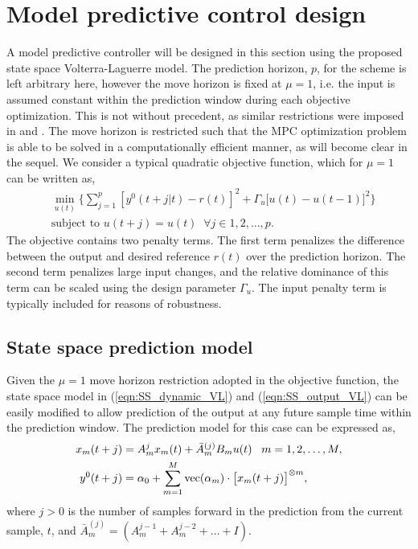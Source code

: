 \section{Model predictive control design}

A model predictive controller will be designed in this section using the proposed state space Volterra-Laguerre model. The prediction horizon, $p$, for the scheme is left arbitrary here, however the move horizon is fixed at $\mu = 1$, i.e. the input is assumed constant within the prediction window during each objective optimization. This is not without precedent, as similar restrictions were imposed in \cite{Parker1998} and \cite{Antoine2006}. The move horizon is restricted such that the MPC optimization problem is able to be solved in a computationally efficient manner, as will become clear in the sequel. We consider a typical quadratic objective function, which for $\mu =1$ can be written as,
\begin{align}
\label{eqn:MPC_ObjFn_Chap10}
&\min_{u(t)} \Bigg\{ \sum_{j=1}^{p} [y^0(t+j|t) - r(t)]^2  + \Gamma_u \big[ u(t) - u(t-1) \big]^2 \Bigg\} \\
&\textrm{subject to } u(t+j) = u(t) \; \; \forall j \in 1,2,\hdots,p. \nonumber
\end{align}
The objective contains two penalty terms. The first term penalizes the difference between the output and desired reference $r(t)$ over the prediction horizon. The second term penalizes large input changes, and the relative dominance of this term can be scaled using the design parameter $\Gamma_u$. The input penalty term is typically included for reasons of robustness.

\subsection{State space prediction model}

Given the $\mu = 1$ move horizon restriction adopted in the objective function, the state space model in (\ref{eqn:SS_dynamic_VL}) and (\ref{eqn:SS_output_VL}) can be easily modified to allow prediction of the output at any future sample time within the prediction window. The prediction model for this case can be expressed as,
\begin{align}
x_m(t+j) &= A_m^j x_m(t) + \bar{A}_m^{(j)} B_m u(t) \; \; \; m = 1,2,\hdots,M, \label{eqn:SS_dynamicpredict_VL}\\
y^0(t+j) &= \alpha_0 + \sum_{m=1}^M \operatorname{vec}(\alpha_m) \cdot \big[ x_m(t+j) \big]^{\otimes m}  \label{eqn:SS_outputpredict_VL},
\end{align}
where $j>0$ is the number of samples forward in the prediction from the current sample, $t$, and $\bar{A}_m^{(j)} = (A_m^{j-1} + A_m^{j-2} + \hdots + I)$.

